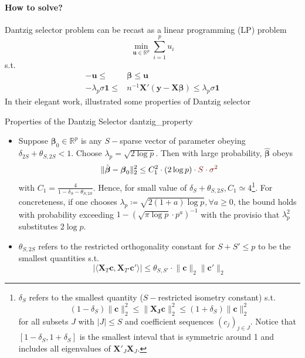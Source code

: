 \documentclass[twoside]{article}
\begin{document}
\paragraph*{How to solve?} Dantzig selector problem can be recast as a linear programming (LP) problem
$$
\min_{\mathbf{u}\in\mathbb{R}^p}\sum^p_{i=1}u_i
$$
s.t.
\begin{align*}
    -\mathbf{u}\leq& \boldsymbol{\beta} \leq \mathbf{u} \\
    -\lambda_p \sigma \mathbf{1} \leq& n^{-1}\mathbf{X}'(\mathbf{y}-\mathbf{X}\boldsymbol{\beta}) \leq \lambda_p\sigma\mathbf{1}
\end{align*}
In their elegant work, \citet{candes2007dantzig} illustrated some properties of Dantzig selector
\begin{theorem}{Properties of the Dantzig Selector \citep{candes2007dantzig}}{dantzig_property}
    \begin{itemize}
        \item Suppose $\boldsymbol{\beta}_0\in\mathbb{R}^p$ is any $S-$sparse vector of parameter obeying $\delta_{2S}+\theta_{S,2S}<1$. Choose $\lambda_p=\sqrt{2\log p}$. Then with large probability, $\hat{\boldsymbol{\beta}}$ obeys $$ \lVert \hat{\boldsymbol{\beta}}-\boldsymbol{\beta}_0 \rVert ^2_2 \leq C_1^2\cdot (2\log p)\cdot \textcolor{myred}{S\cdot \sigma^2} $$ 
        with $C_1 = \frac{4}{1-\delta_S - \theta_{S,2S}}$. Hence, for small value of $\delta_S+ \theta_{S,2S},C_1\simeq 4$\footnote{$\delta_S$ refers to the smallest quantity ($S-$restricted isometry constant) s.t. $$ (1-\delta_S) \lVert \mathbf{c}\rVert^2_2 \leq \lVert \mathbf{X_J} \mathbf{c}\rVert^2_2 \leq (1+\delta_S)\lVert \mathbf{c}\rVert^2_2 $$ for all subsets $J$ with $\lvert J\rvert\leq S$ and coefficient sequences $(c_j)_{j\in J}$. Notice that $[1-\delta_S,1+\delta_S]$ is the smallest inteval that is symmetric around 1 and includes all eigenvalues of $\mathbf{X}'_J\mathbf{X}_J$.}. 
        For concreteness, if one chooses $\lambda_p \coloneq \sqrt{2(1+a)\log p},\forall a\geq 0$, the bound holds with probability exceeding $1-\left(\sqrt{\pi\log p}\cdot p^a\right)^{-1}$ with the provisio that $\lambda^2_p$ substitutes $2\log p$.
        \item $\theta_{S,2S}$ refers to the restricted orthogonality constant for $S+S'\leq p$ to be the smallest quantities s.t. $$ \lvert \langle \mathbf{X}_T\mathbf{c},\mathbf{X}_{T'}\mathbf{c}' \rangle \rvert \leq \theta_{S,S'}\cdot \lVert \mathbf{c}\rVert _2 \lVert \mathbf{c}'\rVert _2 $$
    \end{itemize}
\end{theorem}
\end{document}

